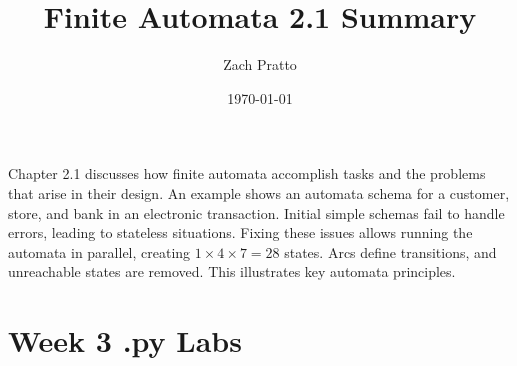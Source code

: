 \documentclass{article}
\begin{document}
\title{Finite Automata 2.1 Summary}
\author{Zach Pratto}
\date{\today}
\maketitle

Chapter 2.1 discusses how finite automata accomplish tasks and the problems that arise in their design. An example shows an automata schema for a customer, store, and bank in an electronic transaction. Initial simple schemas fail to handle errors, leading to stateless situations. Fixing these issues allows running the automata in parallel, creating $1 \times 4 \times 7 = 28$ states. Arcs define transitions, and unreachable states are removed. This illustrates key automata principles.

\section*{Week 3 .py Labs}
\end{document}
